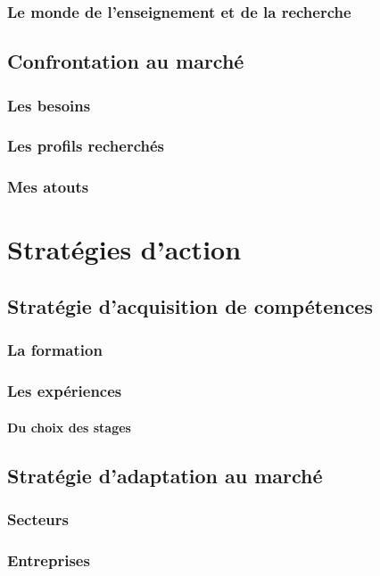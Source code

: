 \documentclass[a4paper,12pt, draft]{report}
\begin{document}
\section{Le monde de l'enseignement et de la recherche}

\chapter{Confrontation au marché}
\section{Les besoins}
\section{Les profils recherchés}
\section{Mes atouts}

\part{Stratégies d'action}

\chapter{Stratégie d'acquisition de compétences}
\section{La formation}
\section{Les expériences}
\subsection{Du choix des stages}

\chapter{Stratégie d'adaptation au marché}
\section{Secteurs}
\section{Entreprises}
\end{document}
